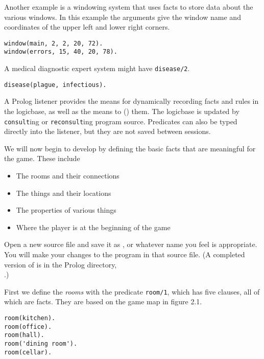 Another example is a windowing system that uses facts to store data about the
various windows. In this example the arguments give the window name and
coordinates of the upper left and lower right corners.
\begin{verbatim}
window(main, 2, 2, 20, 72).
window(errors, 15, 40, 20, 78).
\end{verbatim}

A medical diagnostic expert system might have \verb'disease/2'.
\begin{verbatim}
disease(plague, infectious).
\end{verbatim}

A Prolog listener provides the means for dynamically recording facts and rules
in the logicbase, as well as the means to 
() them. The logicbase is updated by
\verb'consult'ing or \verb'reconsult'ing program source. Predicates can also be
typed directly into the listener, but they are not saved between sessions.


We will now begin to develop  by defining the basic facts that
are meaningful for the game. These include
\begin{itemize}[nosep]
  \item 
The rooms and their connections
  \item 
The things and their locations
  \item 
The properties of various things
  \item 
Where the player is at the beginning of the game
\end{itemize}

Open a new source file and save it as , or whatever name you feel is appropriate. You
will make your changes to the program in that source file. (A completed version
of  is in the Prolog 
directory,\\.)

First we define the \emph{rooms} with the predicate \verb|room/1|, which has
five clauses, all of which are facts. They are based on the game map in figure
2.1.
\begin{verbatim}
room(kitchen).
room(office).
room(hall).
room('dining room').
room(cellar).
\end{verbatim}

